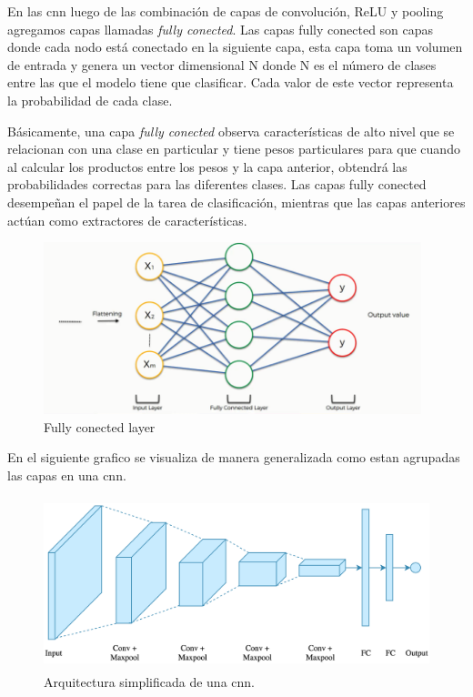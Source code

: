 En las \ac{cnn} luego de las combinación de capas de convolución, ReLU y pooling agregamos capas llamadas \textit{fully conected}. Las capas fully conected son capas donde cada nodo  está conectado en la siguiente capa, esta capa toma un volumen de entrada y genera un vector dimensional N donde N es el número de clases entre las que el modelo tiene que clasificar. Cada valor de este vector representa la probabilidad de cada clase.

Básicamente, una capa \textit{fully conected} observa características de alto nivel que se relacionan con una clase en particular y tiene pesos particulares para que cuando al calcular los productos entre los pesos y la capa anterior, obtendrá las probabilidades correctas para las diferentes clases. Las capas fully conected desempeñan el papel de la tarea de clasificación, mientras que las capas anteriores actúan como extractores de características.

\begin{figure}[H]
 \centering
  \includegraphics[height=5cm,keepaspectratio=true,clip=true]{imagenes/MarcoTeorico/fully_conected.png}
  \caption{Fully conected layer} \label{Fig:fully_conected}
\end{figure}

En el siguiente grafico se visualiza de manera generalizada como estan agrupadas las capas en una \ac{cnn}.

\begin{figure}[H]
 \centering
  \includegraphics[height=5cm,keepaspectratio=true,clip=true]{imagenes/MarcoTeorico/cnn_intuition.png}
  \caption{Arquitectura simplificada de una \ac{cnn}.} \label{Fig:cnn_network}
\end{figure}



